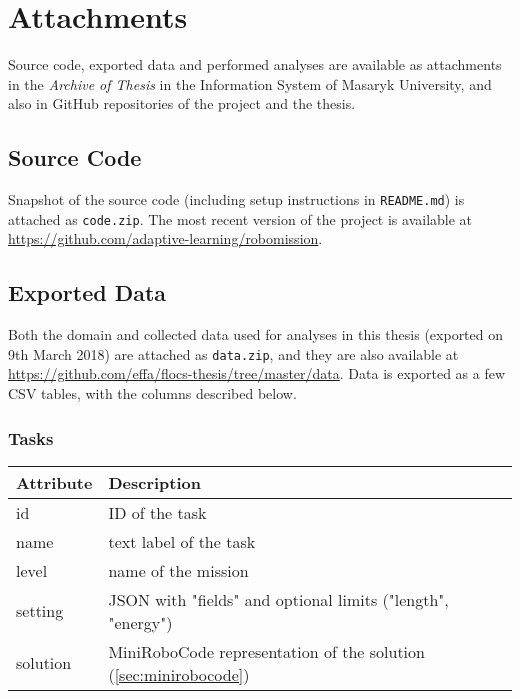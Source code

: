 \chapter{Attachments}
\label{chap:attachments}

Source code, exported data and performed analyses
are available as attachments in the \emph{Archive of Thesis}
in the Information System of Masaryk University,
and also in GitHub repositories of the project and the thesis.

\section{Source Code}
\label{sec:attachment.source-code}

Snapshot of the source code
(including setup instructions in \texttt{README.md})
is attached as \texttt{code.zip}.
The most recent version of the project is available at
\url{https://github.com/adaptive-learning/robomission}.

\section{Exported Data}
\label{sec:attachment.collected-data}

Both the domain and collected data used for analyses in this
thesis (exported on 9th March 2018) are attached as
\texttt{data.zip}, and they are also available at
\url{https://github.com/effa/flocs-thesis/tree/master/data}.
Data is exported as a few CSV tables,
with the columns described below.

\subsection{Tasks}

\begin{tabular}{l l}
\toprule
Attribute & Description \\
\midrule
id & ID of the task \\
name & text label of the task \\
level & name of the mission \\
setting & JSON with "fields" and optional limits ("length", "energy") \\
solution & MiniRoboCode representation of the solution (\cref{sec:minirobocode}) \\
\bottomrule
\end{tabular}


